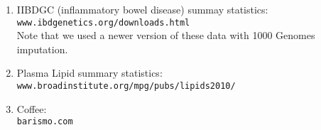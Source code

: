 \documentclass[11pt]{article}
\numberwithin{equation}{section}
\begin{document}
\begin{enumerate}
	\item IIBDGC (inflammatory bowel disease) summay statistics:\\
		\texttt{www.ibdgenetics.org/downloads.html}\\
		Note that we used a newer version of these data with 1000 Genomes imputation.

	\item Plasma Lipid summary statistics:\\
		\texttt{www.broadinstitute.org/mpg/pubs/lipids2010/}
	
	\item Coffee:\\
		\texttt{barismo.com}
\end{enumerate}


%


%


%

\newpage


\end{document}
